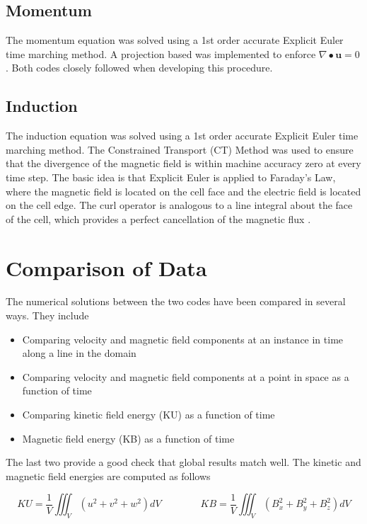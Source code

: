 \documentclass[11pt]{article}
\begin{document}
\subsection{Momentum}
The momentum equation was solved using a 1st order accurate Explicit Euler time marching method. A projection based was implemented to enforce $\nabla \bullet \pmb{u} = 0$. Both codes closely followed \cite{griebel1997numerical} when developing this procedure.

\subsection{Induction}
The induction equation was solved using a 1st order accurate Explicit Euler time marching method. The Constrained Transport (CT) Method was used to ensure that the divergence of the magnetic field is within machine accuracy zero at every time step. The basic idea is that Explicit Euler is applied to Faraday's Law, where the magnetic field is located on the cell face and the electric field is located on the cell edge. The curl operator is analogous to a line integral about the face of the cell, which provides a perfect cancellation of the magnetic flux \cite{Toth2000}.

\section{Comparison of Data}

The numerical solutions between the two codes have been compared in several ways. They include

\begin{itemize}
\item Comparing velocity and magnetic field components at an instance in time along a line in the domain
\item Comparing velocity and magnetic field components at a point in space as a function of time
\item Comparing kinetic field energy (KU) as a function of time
\item Magnetic field energy (KB) as a function of time
\end{itemize}

The last two provide a good check that global results match well. The kinetic and magnetic field energies are computed as follows

\begin{equation}
	KU = \frac{1}{V} \iiint_{V} (u^2+v^2+w^2) dV
	\qquad \qquad
	KB = \frac{1}{V} \iiint_{V} (B_x^2+B_y^2+B_z^2) dV
\end{equation}
\end{document}
